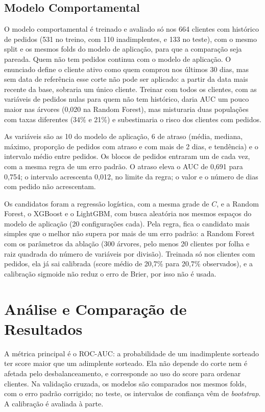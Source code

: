 \documentclass[conference]{IEEEtran}
\begin{document}
\subsection{Modelo Comportamental}
O modelo comportamental é treinado e avaliado só nos 664 clientes com histórico de pedidos (531 no treino, com 110 inadimplentes, e 133 no teste), com o mesmo split e os mesmos folds do modelo de aplicação, para que a comparação seja pareada. Quem não tem pedidos continua com o modelo de aplicação. O enunciado define o cliente ativo como quem comprou nos últimos 30 dias, mas sem data de referência esse corte não pode ser aplicado: a partir da data mais recente da base, sobraria um único cliente. Treinar com todos os clientes, com as variáveis de pedidos nulas para quem não tem histórico, daria AUC um pouco maior nas árvores (0,020 na Random Forest), mas misturaria duas populações com taxas diferentes (34\% e 21\%) e subestimaria o risco dos clientes com pedidos.

As variáveis são as 10 do modelo de aplicação, 6 de atraso (média, mediana, máximo, proporção de pedidos com atraso e com mais de 2 dias, e tendência) e o intervalo médio entre pedidos. Os blocos de pedidos entraram um de cada vez, com a mesma regra de um erro padrão. O atraso eleva o AUC de 0,691 para 0,754; o intervalo acrescenta 0,012, no limite da regra; o valor e o número de dias com pedido não acrescentam.

Os candidatos foram a regressão logística, com a mesma grade de $C$, e a Random Forest, o XGBoost e o LightGBM, com busca aleatória nos mesmos espaços do modelo de aplicação (20 configurações cada). Pela regra, fica o candidato mais simples que o melhor não supera por mais de um erro padrão: a Random Forest com os parâmetros da ablação (300 árvores, pelo menos 20 clientes por folha e raiz quadrada do número de variáveis por divisão). Treinada só nos clientes com pedidos, ela já sai calibrada (score médio de 20,7\% para 20,7\% observados), e a calibração sigmoide não reduz o erro de Brier, por isso não é usada.

\section{Análise e Comparação de Resultados}

A métrica principal é o ROC-AUC: a probabilidade de um inadimplente sorteado ter score maior que um adimplente sorteado. Ela não depende do corte nem é afetada pelo desbalanceamento, e corresponde ao uso do score para ordenar clientes. Na validação cruzada, os modelos são comparados nos mesmos folds, com o erro padrão corrigido; no teste, os intervalos de confiança vêm de \textit{bootstrap}. A calibração é avaliada à parte.
\end{document}
